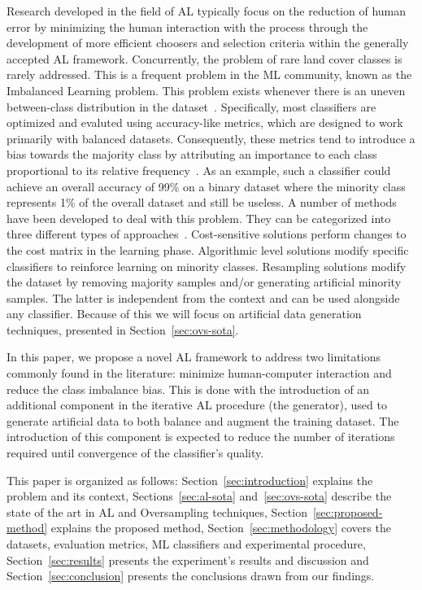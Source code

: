 \documentclass[remotesensing,article,submit,moreauthors,pdftex]{Definitions/mdpi}
\begin{document}
Research developed in the field of AL typically focus on the reduction of
human error by minimizing the human interaction with the process through the
development of more efficient choosers and selection criteria within the
generally accepted AL framework. Concurrently, the problem of rare land cover
classes is rarely addressed. This is a frequent problem in the ML community,
known as the Imbalanced Learning problem. This problem exists whenever there
is an uneven between-class distribution in the dataset~\cite{Chawla2004}.
Specifically, most classifiers are optimized and evaluted using accuracy-like
metrics, which are designed to work primarily with balanced datasets.
Consequently, these metrics tend to introduce a bias towards the majority
class by attributing an importance to each class proportional to its relative
frequency~\cite{Maxwell2018}. As an example, such a classifier could achieve
an overall accuracy of 99\% on a binary dataset where the minority class
represents 1\% of the overall dataset and still be useless. A number of
methods have been developed to deal with this problem. They can be categorized
into three different types of approaches~\cite{Fernandez2013,Kaur2019}.
Cost-sensitive solutions perform changes to the cost matrix in the learning
phase. Algorithmic level solutions modify specific classifiers to reinforce
learning on minority classes. Resampling solutions modify the dataset by
removing majority samples and/or generating artificial minority samples. The
latter is independent from the context and can be used alongside any
classifier. Because of this we will focus on artificial data generation
techniques, presented in Section~\ref{sec:ovs-sota}.

In this paper, we propose a novel AL framework to address two limitations
commonly found in the literature: minimize human-computer interaction and
reduce the class imbalance bias. This is done with the introduction of an
additional component in the iterative AL procedure (the generator), used to
generate artificial data to both balance and augment the training dataset. The
introduction of this component is expected to reduce the number of iterations
required until convergence of the classifier's quality.

This paper is organized as follows: Section~\ref{sec:introduction} explains
the problem and its context, Sections~\ref{sec:al-sota} and~\ref{sec:ovs-sota}
describe the state of the art in AL and Oversampling techniques,
Section~\ref{sec:proposed-method} explains the proposed method,
Section~\ref{sec:methodology} covers the datasets, evaluation metrics, ML
classifiers and experimental procedure, Section~\ref{sec:results} presents the
experiment's results and discussion and Section~\ref{sec:conclusion} presents
the conclusions drawn from our findings.
\end{document}
